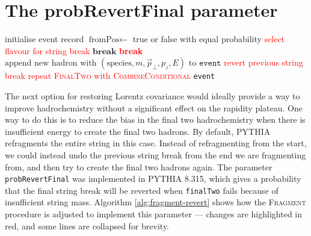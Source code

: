 \documentclass[12pt,a4paper]{report}
\begin{document}
\section{The probRevertFinal parameter}
\begin{algorithm}
  \caption{The PYTHIA 8.315 algorithm for $q\bar{q}$ hadronisation, modified to implement \texttt{probRevertFinal}}
  \label{alg:fragment-revert}
  \begin{algorithmic}
      \Repeat
        \State initialise event record
        \Loop
          \State $\text{fromPos} \gets$ true or false with equal probability 
          \State \textcolor{red}{select flavour for string break}
          \Repeat
            \State $\textbf{break}$
          \EndIf
            \State \textcolor{red}{\textbf{break}}
          \EndIf
          \State $\text{append new hadron with } (\text{species}, m, \vec{p}_\perp, p_z, E) \text{ to } \texttt{event}$
      \EndLoop
        \State \textcolor{red}{revert previous string break}
        \State \textcolor{red}{repeat \textsc{FinalTwo} with \textsc{CombineConditional}}
      \EndIf
    \State \Return \texttt{event}
    \EndProcedure
  \end{algorithmic}
\end{algorithm}

The next option for restoring Lorentz covariance would ideally provide a way to improve hadrochemistry without a significant effect on the rapidity plateau. One way to do this is to reduce the bias in the final two hadrochemistry when there is insufficient energy to create the final two hadrons. By default, PYTHIA refragments the entire string in this case. Instead of refragmenting from the start, we could instead undo the previous string break from the end we are fragmenting from, and then try to create the final two hadrons again. The parameter \texttt{probRevertFinal} was implemented in PYTHIA 8.315, which gives a probability that the final string break will be reverted when \texttt{finalTwo} fails because of insufficient string mass. Algorithm \ref{alg:fragment-revert} shows how the \textsc{Fragment} procedure is adjusted to implement this parameter --- changes are highlighted in red, and some lines are collapsed for brevity.
\end{document}
